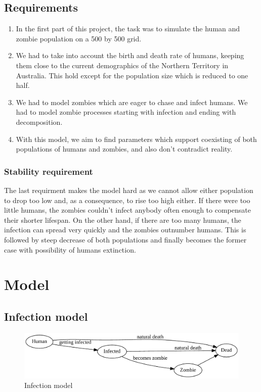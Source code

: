 \documentclass[a4paper]{article}
\begin{document}
\subsection{Requirements}

\begin{enumerate}
\item In the first part of this project, the task was to simulate the human and zombie population on a 500 by 500 grid.
\item We had to take into account the birth and death rate of humans, keeping them close to the current demographics of the Northern Territory in Australia.
    This hold except for the population size which is reduced to one half. \cite{project}
\item We had to model zombies which are eager to chase and infect humans.
    We had to model zombie processes starting with infection and ending with decomposition.
\item With this model, we aim to find parameters which support coexisting of both populations of humans and zombies, and also don't contradict reality.
\end{enumerate}

\subsubsection{Stability requirement}

The last requirment makes the model hard as we cannot allow either population to drop too low and, as a consequence, to rise too high either.
If there were too little humans, the zombies couldn't infect anybody often enough to compensate their shorter lifespan.
On the other hand, if there are too many humans, the infection can spread very quickly and the zombies outnumber humans.
This is followed by steep decrease of both populations and finally becomes the former case with possibility of humans extinction.

\section{Model} %

\subsection{Infection model}

\begin{figure}[ht]
        \centering
        \includegraphics[width=\textwidth]{model}
        \caption{Infection model}
\end{figure}
\end{document}
